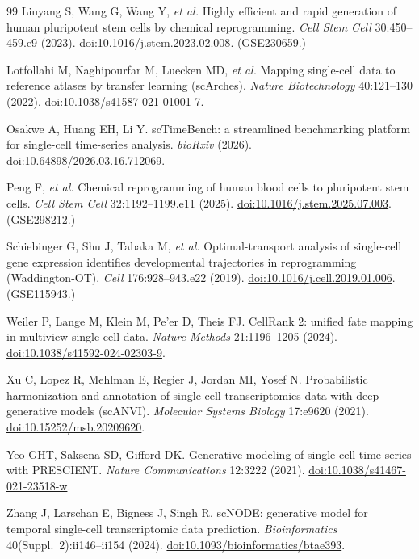 \documentclass[11pt]{article}
\begin{document}
\begin{thebibliography}{99}
Liuyang S, Wang G, Wang Y, \emph{et al.}
Highly efficient and rapid generation of human pluripotent stem cells by chemical
reprogramming.
\emph{Cell Stem Cell} 30:450--459.e9 (2023).
\href{https://doi.org/10.1016/j.stem.2023.02.008}{doi:10.1016/j.stem.2023.02.008}.
(GSE230659.)

Lotfollahi M, Naghipourfar M, Luecken MD, \emph{et al.}
Mapping single-cell data to reference atlases by transfer learning (scArches).
\emph{Nature Biotechnology} 40:121--130 (2022).
\href{https://doi.org/10.1038/s41587-021-01001-7}{doi:10.1038/s41587-021-01001-7}.

Osakwe A, Huang EH, Li Y.
scTimeBench: a streamlined benchmarking platform for single-cell time-series analysis.
\emph{bioRxiv} (2026).
\href{https://doi.org/10.64898/2026.03.16.712069}{doi:10.64898/2026.03.16.712069}.

Peng F, \emph{et al.}
Chemical reprogramming of human blood cells to pluripotent stem cells.
\emph{Cell Stem Cell} 32:1192--1199.e11 (2025).
\href{https://doi.org/10.1016/j.stem.2025.07.003}{doi:10.1016/j.stem.2025.07.003}.
(GSE298212.)

Schiebinger G, Shu J, Tabaka M, \emph{et al.}
Optimal-transport analysis of single-cell gene expression identifies developmental
trajectories in reprogramming (Waddington-OT).
\emph{Cell} 176:928--943.e22 (2019).
\href{https://doi.org/10.1016/j.cell.2019.01.006}{doi:10.1016/j.cell.2019.01.006}.
(GSE115943.)

Weiler P, Lange M, Klein M, Pe'er D, Theis FJ.
CellRank 2: unified fate mapping in multiview single-cell data.
\emph{Nature Methods} 21:1196--1205 (2024).
\href{https://doi.org/10.1038/s41592-024-02303-9}{doi:10.1038/s41592-024-02303-9}.

Xu C, Lopez R, Mehlman E, Regier J, Jordan MI, Yosef N.
Probabilistic harmonization and annotation of single-cell transcriptomics data with
deep generative models (scANVI).
\emph{Molecular Systems Biology} 17:e9620 (2021).
\href{https://doi.org/10.15252/msb.20209620}{doi:10.15252/msb.20209620}.

Yeo GHT, Saksena SD, Gifford DK.
Generative modeling of single-cell time series with PRESCIENT.
\emph{Nature Communications} 12:3222 (2021).
\href{https://doi.org/10.1038/s41467-021-23518-w}{doi:10.1038/s41467-021-23518-w}.

Zhang J, Larschan E, Bigness J, Singh R.
scNODE: generative model for temporal single-cell transcriptomic data prediction.
\emph{Bioinformatics} 40(Suppl.~2):ii146--ii154 (2024).
\href{https://doi.org/10.1093/bioinformatics/btae393}{doi:10.1093/bioinformatics/btae393}.

\end{thebibliography}
\end{document}

